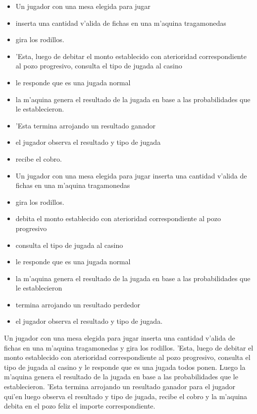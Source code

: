 \escenario
{
\begin{itemize}
 \item Un jugador con una mesa elegida para jugar
\item  inserta una cantidad v'alida de fichas en una m'aquina tragamonedas
\item  gira los rodillos. 
\item 'Esta, luego de debitar el monto establecido con aterioridad correspondiente al pozo progresivo, consulta el tipo de jugada al casino 
\item le responde que es una jugada normal
\item la m'aquina genera el resultado de la jugada en base a las probabilidades que le establecieron. 
\item 'Esta termina arrojando un resultado ganador 
\item el jugador observa el resultado y tipo de jugada 
\item recibe el cobro.

\end{itemize}

}

\escenario
{
\begin{itemize}
  \item Un jugador con una mesa elegida para jugar inserta una cantidad v'alida de fichas en una m'aquina tragamonedas 
  \item gira los rodillos. 
  \item debita el monto establecido con aterioridad correspondiente al pozo progresivo
  \item consulta el tipo de jugada al casino
  \item le responde que es una jugada normal
  \item la m'aquina genera el resultado de la jugada en base a las probabilidades que le establecieron
  \item termina arrojando un resultado perdedor
  \item el jugador observa el resultado y tipo de jugada.
\end{itemize}
}

\escenario
{
Un jugador con una mesa elegida para jugar inserta una cantidad v'alida de fichas en una m'aquina tragamonedas y gira los rodillos. 'Esta, luego de debitar el monto establecido con aterioridad correspondiente al pozo progresivo, consulta el tipo de jugada al casino y le responde que es una jugada todos ponen. Luego la m'aquina genera el resultado de la jugada en base a las probabilidades que le establecieron. 'Esta termina arrojando un resultado ganador para el jugador qui'en luego observa el resultado y tipo de jugada, recibe el cobro y la m'aquina debita en el pozo feliz el importe correspondiente.
}

